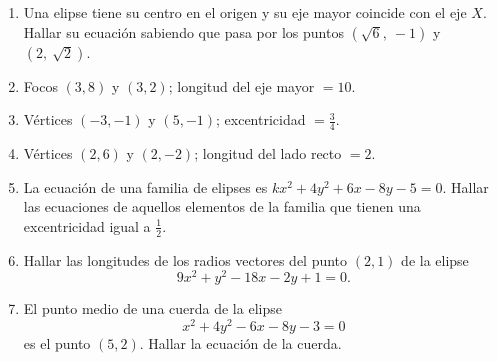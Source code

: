 \documentclass[12pt,a4paper]{article}
\begin{document}
\begin{enumerate}
\item Una elipse tiene su centro en el origen y su eje mayor coincide con el eje \(X\).
Hallar su ecuación sabiendo que pasa por los puntos \( (\sqrt{6},\ -1) \) y \( (2,\ \sqrt{2}) \).
\item Focos \((3,8)\) y \((3,2)\); longitud del eje mayor \(= 10\).
\item Vértices \((-3,-1)\) y \((5,-1)\); excentricidad \(= \frac{3}{4}\).
\item Vértices \((2,6)\) y \((2,-2)\); longitud del lado recto \(= 2\).
\item La ecuación de una familia de elipses es \( kx^2 + 4y^2 + 6x - 8y - 5 = 0 \).
Hallar las ecuaciones de aquellos elementos de la familia que tienen una excentricidad
igual a \( \frac{1}{2} \).
\item Hallar las longitudes de los radios vectores del punto \((2,1)\) de la elipse
\[ 9x^2 + y^2 - 18x - 2y + 1 = 0. \]
\item El punto medio de una cuerda de la elipse
\[ x^2 + 4y^2 - 6x - 8y - 3 = 0 \]
es el punto \((5,2)\). Hallar la ecuación de la cuerda.
\end{enumerate}
\end{document}
